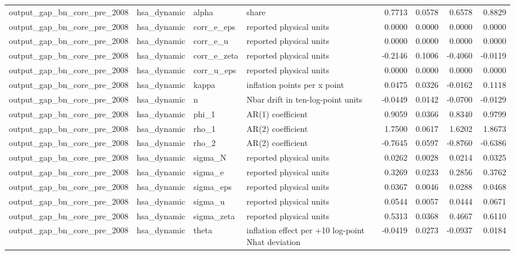 \begin{tabular}{llllrrrr}
output\_gap\_bn\_core\_pre\_2008 & hsa\_dynamic & alpha & share & 0.7713 & 0.0578 & 0.6578 & 0.8829 \\
output\_gap\_bn\_core\_pre\_2008 & hsa\_dynamic & corr\_e\_eps & reported physical units & 0.0000 & 0.0000 & 0.0000 & 0.0000 \\
output\_gap\_bn\_core\_pre\_2008 & hsa\_dynamic & corr\_e\_u & reported physical units & 0.0000 & 0.0000 & 0.0000 & 0.0000 \\
output\_gap\_bn\_core\_pre\_2008 & hsa\_dynamic & corr\_e\_zeta & reported physical units & -0.2146 & 0.1006 & -0.4060 & -0.0119 \\
output\_gap\_bn\_core\_pre\_2008 & hsa\_dynamic & corr\_u\_eps & reported physical units & 0.0000 & 0.0000 & 0.0000 & 0.0000 \\
output\_gap\_bn\_core\_pre\_2008 & hsa\_dynamic & kappa & inflation points per x point & 0.0475 & 0.0326 & -0.0162 & 0.1118 \\
output\_gap\_bn\_core\_pre\_2008 & hsa\_dynamic & n & Nbar drift in ten-log-point units & -0.0449 & 0.0142 & -0.0700 & -0.0129 \\
output\_gap\_bn\_core\_pre\_2008 & hsa\_dynamic & phi\_1 & AR(1) coefficient & 0.9059 & 0.0366 & 0.8340 & 0.9799 \\
output\_gap\_bn\_core\_pre\_2008 & hsa\_dynamic & rho\_1 & AR(2) coefficient & 1.7500 & 0.0617 & 1.6202 & 1.8673 \\
output\_gap\_bn\_core\_pre\_2008 & hsa\_dynamic & rho\_2 & AR(2) coefficient & -0.7645 & 0.0597 & -0.8760 & -0.6386 \\
output\_gap\_bn\_core\_pre\_2008 & hsa\_dynamic & sigma\_N & reported physical units & 0.0262 & 0.0028 & 0.0214 & 0.0325 \\
output\_gap\_bn\_core\_pre\_2008 & hsa\_dynamic & sigma\_e & reported physical units & 0.3269 & 0.0233 & 0.2856 & 0.3762 \\
output\_gap\_bn\_core\_pre\_2008 & hsa\_dynamic & sigma\_eps & reported physical units & 0.0367 & 0.0046 & 0.0288 & 0.0468 \\
output\_gap\_bn\_core\_pre\_2008 & hsa\_dynamic & sigma\_u & reported physical units & 0.0544 & 0.0057 & 0.0444 & 0.0671 \\
output\_gap\_bn\_core\_pre\_2008 & hsa\_dynamic & sigma\_zeta & reported physical units & 0.5313 & 0.0368 & 0.4667 & 0.6110 \\
output\_gap\_bn\_core\_pre\_2008 & hsa\_dynamic & theta & inflation effect per +10 log-point Nhat deviation & -0.0419 & 0.0273 & -0.0937 & 0.0184 \\

\end{tabular}
